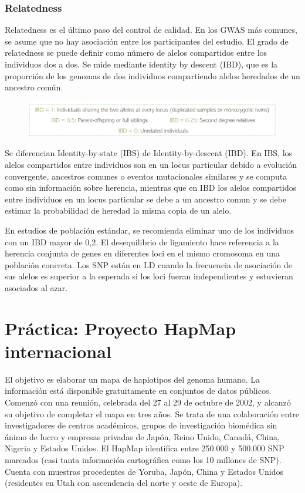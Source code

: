 \subsubsection{Relatedness}
Relatedness es el último paso del control de calidad. En los GWAS más comunes, se asume que no hay asociación entre los participantes del estudio. El grado de relatedness se puede definir como número de alelos compartidos entre los individuos dos a dos. Se mide mediante identity by descent (IBD), que es la proporción de los genomas de dos individuos compartiendo alelos heredados de un ancestro común. 

\begin{figure}[htbp]
\centering
\includegraphics[width = \textwidth]{figs/ibd.png}
\end{figure}

Se diferencian Identity-by-state (IBS) de Identity-by-descent (IBD). En IBS, los alelos compartidos entre individuos son en un locus particular debido a evolución convergente, ancestros comunes o eventos mutacionales similares y se computa como sin información sobre herencia, mientras que en IBD los alelos compartidos entre individuos en un locus particular se debe a un ancestro comun y se debe estimar la probabilidad de heredad la misma copia de un alelo.

En estudios de población estándar, se recomienda eliminar uno de los individuos con un IBD mayor de 0,2. El desequilibrio de ligamiento hace referencia a la herencia conjunta de genes en diferentes loci en el mismo cromosoma en una población concreta. Los SNP están en LD cuando la frecuencia de asociación de sus alelos es superior a la esperada si los loci fueran independientes y estuvieran asociados al azar. 

\section{Práctica: Proyecto HapMap internacional}
El objetivo es elaborar un mapa de haplotipos del genoma humano. La información está disponible gratuitamente en conjuntos de datos públicos. Comenzó con una reunión, celebrada del 27 al 29 de octubre de 2002, y alcanzó su objetivo de completar el mapa en tres años. Se trata de una colaboración entre investigadores de centros académicos, grupos de investigación biomédica sin ánimo de lucro y empresas privadas de Japón, Reino Unido, Canadá, China, Nigeria y Estados Unidos. El HapMap identifica entre 250.000 y 500.000 SNP marcados (casi tanta información cartográfica como los 10 millones de SNP). Cuenta con muestras procedentes de Yoruba, Japón, China y Estados Unidos (residentes en Utah con ascendencia del norte y oeste de Europa).

